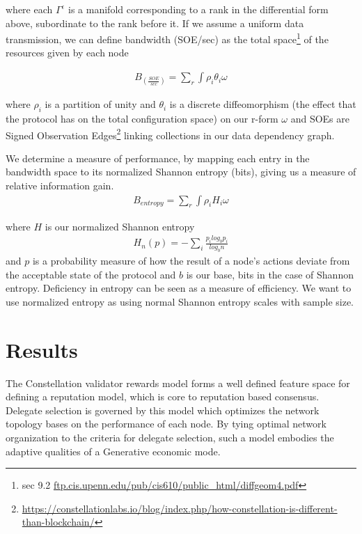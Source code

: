 \documentclass{article}
\begin{document}
where each $\Gamma^{\epsilon}$ is a manifold corresponding to a rank in the differential form above, subordinate to the rank before it. If we assume a uniform data transmission, we can define bandwidth (SOE/sec) as the total space\footnote{sec 9.2 \url{ftp.cis.upenn.edu/pub/cis610/public_html/diffgeom4.pdf}} of the resources given by each node

\begin{equation*} \label{eq1}
\begin{split}
B_{(\frac{SOE}{sec})} = \sum_{r} \int \rho_i \theta_i \omega
\end{split}
\end{equation*}

where $\rho_i$ is a partition of unity and $\theta_i$ is a discrete diffeomorphism (the effect that the protocol has on the total configuration space) on our r-form $\omega$ and SOEs are Signed Observation Edges\footnote{\url{https://constellationlabs.io/blog/index.php/how-constellation-is-different-than-blockchain/}} linking collections in our data dependency graph.

We determine a measure of performance, by mapping each entry in the bandwidth space to its normalized Shannon entropy (bits), giving us a measure of relative information gain.
\begin{equation*} \label{eq1}
\begin{split}
B_{entropy} = \sum_{r} \int \rho_i H_i \omega 
\end{split}
\end{equation*}

where $H$ is our normalized Shannon entropy
\begin{equation*} \label{eq1}
\begin{split}
H_n(p) = - \sum_i \frac{p_i log_b p_i}{log_b n}
\end{split}
\end{equation*}
and $p$ is a probability measure of how the result of a node's actions deviate from the acceptable state of the protocol and $b$ is our base, bits in the case of Shannon entropy. Deficiency in entropy can be seen as a measure of efficiency. We want to use normalized entropy as using normal Shannon entropy scales with sample size.

\section{Results}
The Constellation validator rewards model forms a well defined feature space for defining a reputation model, which is core to reputation based consensus. Delegate selection is governed by this model which optimizes the network topology bases on the performance of each node. By tying optimal network organization to the criteria for delegate selection, such a model embodies the adaptive qualities of a Generative economic mode.
\end{document}
